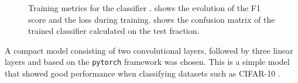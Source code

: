 \begin{figure}
    \centering
    \caption[Training metrics for the classifier.]{Training metrics for the classifier \cite{Brugnolotto2024}.  shows the evolution of the F1 score and the loss during training.  shows the confusion matrix of the trained classifier calculated on the test fraction.}
    \label{fig:training_metrics}
\end{figure}

A compact model consisting of two convolutional layers, followed by three linear layers and based on the \texttt{pytorch} \cite{NEURIPS2019_9015, pytorch} framework was chosen. This is a simple model that showed good performance when classifying datasets such as CIFAR-10 \cite{NIPS2012_c399862d}.







